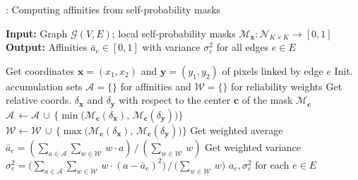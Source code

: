\begin{algorithm}[t]
  \begin{flushleft}
  \caption{: Computing affinities from self-probability masks}
   \hspace*{\algorithmicindent} \textbf{Input:} Graph $\mathcal{G}(V,E)$; local self-probability masks $\mathcal{M}_{\mathbf{x}}: \mathcal{N}_{K\times K} \rightarrow [0,1]$  \\
  \hspace*{\algorithmicindent} \textbf{Output:} Affinities $\bar{a}_e\in[0,1]$ with variance $\sigma^2_e$ for all edges $e\in E$\\
  \hspace*{\algorithmicindent} 
  \begin{algorithmic}[1]
  \footnotesize
        \State Get coordinates $\mathbf{x}=(x_1,x_2)$ and $\mathbf{y}=(y_1,y_2)$ of pixels linked by edge $e$
        \State Init. accumulation sets $\mathcal{A}=\{\}$ for affinities and $\mathcal{W}=\{\}$ for reliability weights
            \State Get relative coords. $\delta_\mathbf{x}$ and $\delta_\mathbf{y}$ with respect to the center $\mathbf{c}$ of the mask $\mathcal{M}_{\mathbf{c}}$
            \State $\mathcal{A}\,\gets \mathcal{A} \,\cup\,\{\min \big(\mathcal{M}_{\mathbf{c}}(\delta_\mathbf{x}), \,\mathcal{M}_{\mathbf{c}}(\delta_\mathbf{y})\big)\}$ 
            \State $\mathcal{W}\gets \mathcal{W} \,\cup\,\{\max \big(\mathcal{M}_{\mathbf{c}}(\delta_\mathbf{x}), \,\mathcal{M}_{\mathbf{c}}(\delta_\mathbf{y})\big)\}$ 
        \EndFor
        \State Get weighted average $\bar{a}_e= (\sum_{a\in\mathcal{A}}\sum_{w\in\mathcal{W}} \,w\cdot a)\,/\,(\sum_{w\in\mathcal{W}}\,w)$ 
        \State Get weighted variance $\sigma^2_e = \big(\sum_{a\in\mathcal{A}}\sum_{w\in\mathcal{W}} \,w\cdot (a-\bar{a}_e)^2\big)\,/\,\big(\sum_{w\in\mathcal{W}}\,w\big)$
      \EndFor
      \State
      \Return $a_e, \sigma^2_e$ for each $e\in E$
  \end{algorithmic}
    \label{computing_affinities}
  \end{flushleft}

\end{algorithm}

